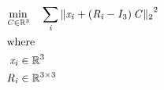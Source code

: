 \documentclass[12pt]{article}
\begin{document}
\begin{center}
\resizebox{\textwidth}{!} 
{
\begin{minipage}[c]{\textwidth}
\begin{align*}
 \omit \span \begin{aligned} \min_{\mathit{C} \in \mathbb{R}^{ 3}} \quad & \sum_\mathit{i} {\|\mathit{x}_{ \mathit{i} } + \left( \mathit{R}_{ \mathit{i} } - I_{ 3 } \right)\mathit{C}\|_2}^{2} \\
\end{aligned} \\
\intertext{where} 
\mathit{x}_{\mathit{i}} & \in \mathbb{R}^{ 3} \\
\mathit{R}_{\mathit{i}} & \in \mathbb{R}^{ 3 \times 3 } \\
\\
\end{align*}
\end{minipage}
}
\end{center}
\end{document}
